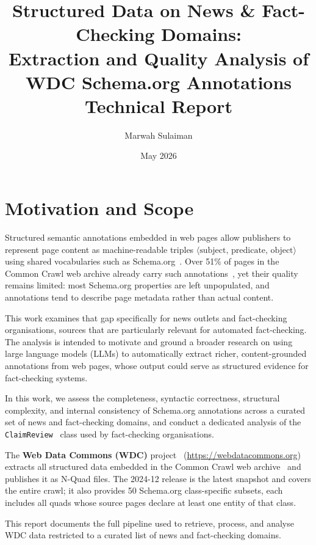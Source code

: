 \documentclass[11pt,a4paper]{article}
\title{\textbf{Structured Data on News \& Fact-Checking Domains:\\
  Extraction and Quality Analysis of WDC Schema.org Annotations}\\[0.5em]
  \large Technical Report}
\author{Marwah Sulaiman}
\date{May 2026}
\begin{document}
\maketitle
\tableofcontents
\newpage

\section{Motivation and Scope}
\label{sec:motivation}

Structured semantic annotations embedded in web pages allow publishers to
represent page content as machine-readable triples
$\langle\text{subject, predicate, object}\rangle$ using shared vocabularies
such as Schema.org~\citep{guha2016schema}.  Over 51\% of pages in the Common
Crawl web archive already carry such annotations~\cite{webdatacommons2024},
yet their quality remains limited: most Schema.org properties are left
unpopulated, and annotations tend to describe page metadata rather than
actual content.

This work examines that gap specifically for news outlets and fact-checking
organisations, sources that are particularly relevant for automated
fact-checking.  The analysis is intended to motivate and ground a broader
research on using large language models (LLMs) to automatically
extract richer, content-grounded annotations from web pages, whose output
could serve as structured evidence for fact-checking systems.

In this work, we assess the completeness, syntactic correctness, structural complexity, and internal consistency of Schema.org annotations across a curated set of news and fact-checking domains, and conduct a dedicated analysis of the \texttt{ClaimReview}~\citep{schemaorg_claimreview} class used by fact-checking organisations.

The \textbf{Web Data Commons (WDC)} project~\citep{meusel2014wdc} (\url{https://webdatacommons.org})
extracts all structured data embedded in the Common Crawl web archive~\citep{commoncrawl2024} and
publishes it as N-Quad files.  The 2024-12 release is the latest snapshot and
covers the entire crawl; it also provides 50 Schema.org class-specific
subsets, each includes all quads whose source pages declare at least one
entity of that class.

This report documents the full pipeline used to retrieve, process, and
analyse WDC data restricted to a curated list of news and fact-checking
domains.
\end{document}
